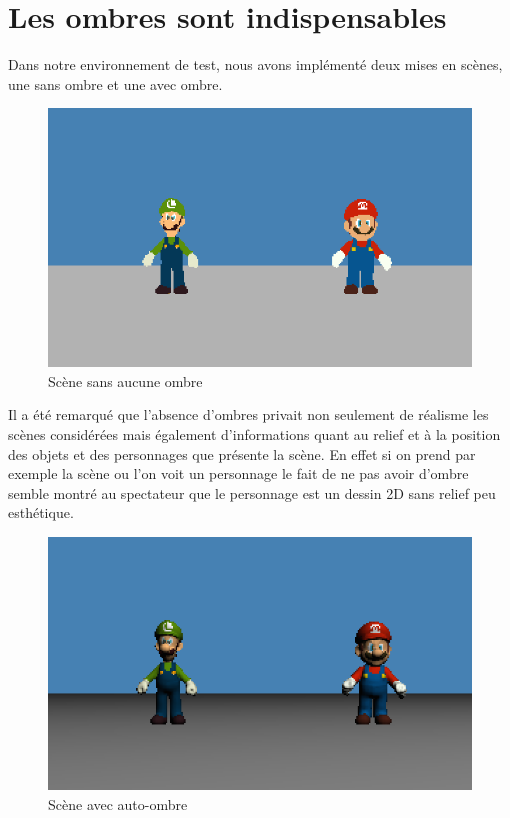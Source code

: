 \documentclass[a4paper,10pt]{report}
\begin{document}
\section{Les ombres sont indispensables}

Dans notre environnement de test, nous avons implémenté deux mises en scènes, une sans ombre et une avec ombre.

\begin{figure}[H]
\includegraphics[scale=0.5]{images/pasombre.png}
\centering
\caption{Scène sans aucune ombre}
\end{figure}

Il a été remarqué que l'absence d'ombres privait non seulement de réalisme les scènes considérées mais également d'informations quant au relief et à la position des objets et des personnages que présente la scène. En effet si on prend par exemple la scène ou l'on voit un personnage le fait de ne pas avoir d'ombre semble montré au spectateur que le personnage est un dessin 2D sans relief peu esthétique.

\begin{figure}[H]
\includegraphics[scale=0.5]{images/autoombre.png}
\centering
\caption{Scène avec auto-ombre}
\end{figure}
\end{document}
